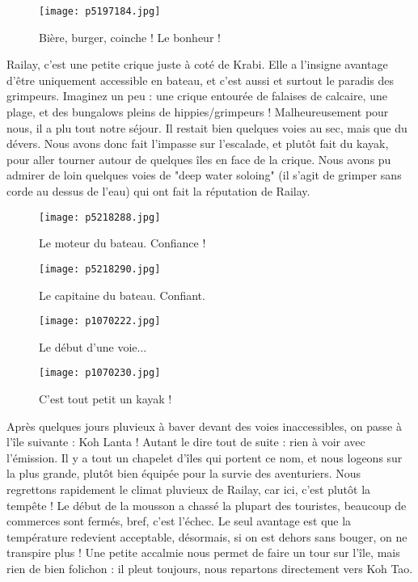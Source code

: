 \documentclass{book}
\begin{document}
\begin{figure}[h]
\centering
\texttt{[image: p5197184.jpg]}
\caption*{Bière, burger, coinche ! Le bonheur !}
\end{figure}

Railay, c'est une petite crique juste à coté de Krabi. Elle a l'insigne avantage d'être uniquement accessible en bateau, et c'est aussi et surtout le paradis des grimpeurs. Imaginez un peu : une crique entourée de falaises de calcaire, une plage, et des bungalows pleins de hippies/grimpeurs ! Malheureusement pour nous, il a plu tout notre séjour. Il restait bien quelques voies au sec, mais que du dévers. Nous avons donc fait l'impasse sur l'escalade, et plutôt fait du kayak, pour aller tourner autour de quelques îles en face de la crique. Nous avons pu admirer de loin quelques voies de "deep water soloing" (il s'agit de grimper sans corde au dessus de l'eau) qui ont fait la réputation de Railay.


\begin{figure}[h]
\centering
\texttt{[image: p5218288.jpg]}
\caption*{Le moteur du bateau. Confiance !}
\end{figure}


\begin{figure}[h]
\centering
\texttt{[image: p5218290.jpg]}
\caption*{Le capitaine du bateau. Confiant.}
\end{figure}


\begin{figure}[h]
\centering
\texttt{[image: p1070222.jpg]}
\caption*{Le début d'une voie...}
\end{figure}


\begin{figure}[h]
\centering
\texttt{[image: p1070230.jpg]}
\caption*{C'est tout petit un kayak !}
\end{figure}

Après quelques jours pluvieux à baver devant des voies inaccessibles, on passe à l'île suivante : Koh Lanta ! Autant le dire tout de suite : rien à voir avec l'émission. Il y a tout un chapelet d'îles qui portent ce nom, et nous logeons sur la plus grande, plutôt bien équipée pour la survie des aventuriers. Nous regrettons rapidement le climat pluvieux de Railay, car ici, c'est plutôt la tempête ! Le début de la mousson a chassé la plupart des touristes, beaucoup de commerces sont fermés, bref, c'est l'échec. Le seul avantage est que la température redevient acceptable, désormais, si on est dehors sans bouger, on ne transpire plus ! Une petite accalmie nous permet de faire un tour sur l'île, mais rien de bien folichon : il pleut toujours, nous repartons directement vers Koh Tao.
\end{document}
